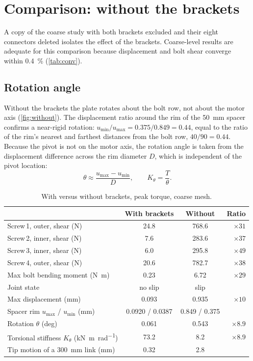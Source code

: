 \documentclass[11pt,letterpaper]{article}
\begin{document}
\section{Comparison: without the brackets}
A copy of the coarse study with both brackets excluded and their eight connectors deleted
isolates the effect of the brackets. Coarse-level results are adequate for this comparison
because displacement and bolt shear converge within \SI{0.4}{\percent} (\cref{tab:conv}).

\subsection{Rotation angle}
Without the brackets the plate rotates about the bolt row, not about the motor axis
(\cref{fig:without}). The displacement ratio around the rim of the
\SI{50}{mm} spacer confirms a near-rigid rotation:
$u_{\min}/u_{\max}=0.375/0.849=0.44$, equal to the ratio of the rim's nearest and farthest
distances from the bolt row, $40/90=0.44$. Because the pivot is not on the motor axis, the
rotation angle is taken from the displacement difference across the rim diameter $D$,
which is independent of the pivot location:
\begin{equation}
  \theta \approx \frac{u_{\max}-u_{\min}}{D}, \qquad K_\theta = \frac{T}{\theta}.
\end{equation}

\begin{table}[H]
\centering
\caption{With versus without brackets, peak torque, coarse mesh.}
\label{tab:bolts}
\begin{tabular}{@{}lS[table-format=5.3]S[table-format=5.3]r@{}}
\toprule
 & {With brackets} & {Without} & Ratio \\
\midrule
Screw\,1, outer, shear (N)        & 24.8  & 768.6 & $\times31$ \\
Screw\,2, inner, shear (N)        & 7.6   & 283.6 & $\times37$ \\
Screw\,3, inner, shear (N)        & 6.0   & 295.8 & $\times49$ \\
Screw\,4, outer, shear (N)        & 20.6  & 782.7 & $\times38$ \\
Max bolt bending moment (\si{\newton\metre}) & 0.23 & 6.72 & $\times29$ \\
Joint state                       & {no slip} & {slip} & \\
\midrule
Max displacement (mm)             & 0.093 & 0.935 & $\times10$ \\
Spacer rim $u_{\max}$ / $u_{\min}$ (mm) & {0.0920 / 0.0387} & {0.849 / 0.375} & \\
Rotation $\theta$ (deg)           & 0.061 & 0.543 & $\times8.9$ \\
Torsional stiffness $K_\theta$ (\si{\kilo\newton\metre\per\radian}) & 73.2 & 8.2 & $\times8.9$ \\
Tip motion of a \SI{300}{mm} link (mm) & 0.32 & 2.8 & \\
\bottomrule
\end{tabular}
\end{table}
\end{document}
